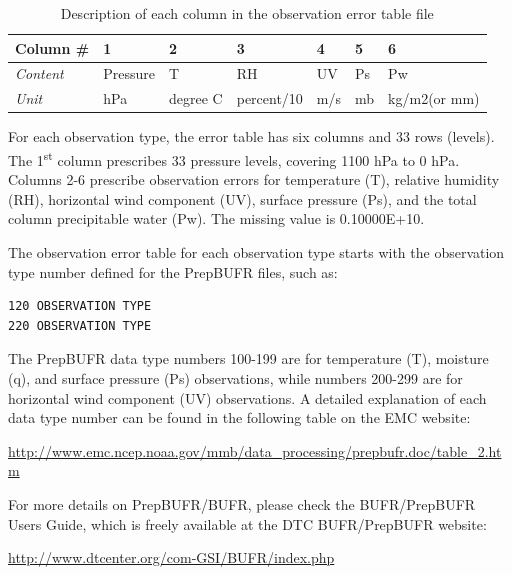 \begin{table}[htbp]
\centering
\caption{Description of each column in the observation error table file}
\begin{tabular}{|p{2cm}|p{2cm}|p{2cm}|p{2cm}|p{1cm}|p{1cm}|p{2.5cm}|}
\hline
\hline
 Column \# & 1 & 2 & 3 & 4 & 5 & 6  \\
\hline
\textit{Content} & Pressure & T & RH & UV & Ps & Pw \\
\hline
\textit{Unit} & hPa & degree C & percent/10 & m/s & mb & kg/m2(or mm)\\
\hline
\end{tabular}
\label{tab410}
\end{table} 

For each observation type, the error table has six columns and 33 rows (levels). The 1\textsuperscript{st} column prescribes 33 pressure levels, covering 1100 hPa to 0 hPa. Columns 2-6 prescribe observation errors for temperature (T), relative humidity (RH), horizontal wind component (UV), surface pressure (Ps), and the total column precipitable water (Pw). The missing value is 0.10000E+10. 

The observation error table for each observation type starts with the observation type number defined for the PrepBUFR files, such as:

\begin{scriptsize}
\begin{verbatim}
120 OBSERVATION TYPE
220 OBSERVATION TYPE
\end{verbatim}
\end{scriptsize}

The PrepBUFR data type numbers 100-199 are for temperature (T), moisture (q), and surface pressure (Ps) observations, while numbers 200-299 are for horizontal wind component (UV) observations. A detailed explanation of each data type number can be found in the following table on the EMC website: 

\begin{small}
\url{http://www.emc.ncep.noaa.gov/mmb/data_processing/prepbufr.doc/table_2.htm}
\end{small}

For more details on PrepBUFR/BUFR, please check the BUFR/PrepBUFR User\textquotesingle s Guide, which is freely available at the DTC BUFR/PrepBUFR website:

\begin{small}
\url{http://www.dtcenter.org/com-GSI/BUFR/index.php}
\end{small}


